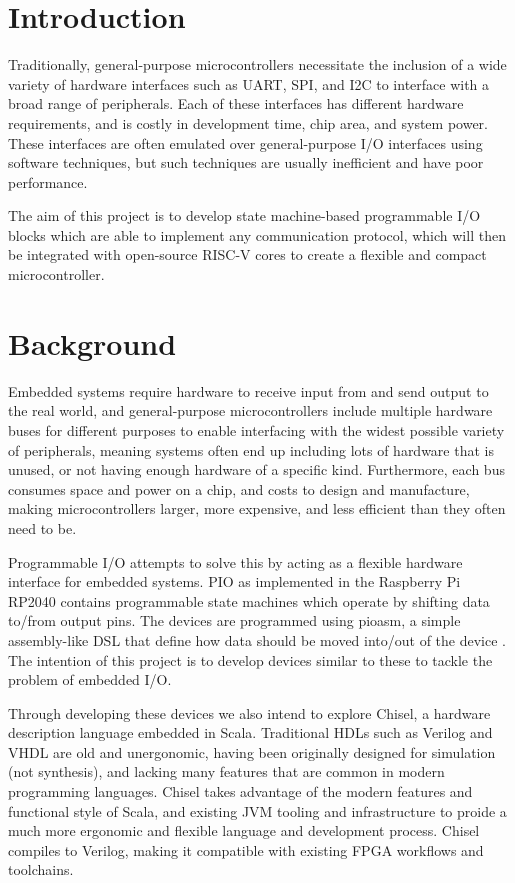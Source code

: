 \documentclass[a4paper,fleqn,12pt]{article}
\begin{document}


\pagestyle{plain}

\section{Introduction}

Traditionally, general-purpose microcontrollers necessitate the inclusion of a wide variety of hardware interfaces such as UART, SPI, and I2C to interface with a broad range of peripherals. Each of these interfaces has different hardware requirements, and is costly in development time, chip area, and system power. These interfaces are often emulated over general-purpose I/O interfaces using software techniques, but such techniques are usually inefficient and have poor performance.

The aim of this project is to develop state machine-based programmable I/O blocks which are able to implement any communication protocol, which will then be integrated with open-source RISC-V cores to create a flexible and compact microcontroller.

\section{Background}

Embedded systems require hardware to receive input from and send output to the real world, and general-purpose microcontrollers include multiple hardware buses for different purposes to enable interfacing with the widest possible variety of peripherals, meaning systems often end up including lots of hardware that is unused, or not having enough hardware of a specific kind. Furthermore, each bus consumes space and power on a chip, and costs to design and manufacture, making microcontrollers larger, more expensive, and less efficient than they often need to be.

Programmable I/O attempts to solve this by acting as a flexible hardware interface for embedded systems. PIO as implemented in the Raspberry Pi RP2040 contains programmable state machines which operate by shifting data to/from output pins. The devices are programmed using pioasm, a simple assembly-like DSL that define how data should be moved into/out of the device \cite{rp2040}. The intention of this project is to develop devices similar to these to tackle the problem of embedded I/O.

Through developing these devices we also intend to explore Chisel, a hardware description language embedded in Scala. Traditional HDLs such as Verilog and VHDL are old and unergonomic, having been originally designed for simulation (not synthesis), and lacking many features that are common in modern programming languages. Chisel takes advantage of the modern features and functional style of Scala, and existing JVM tooling and infrastructure to proide a much more ergonomic and flexible language and development process. Chisel compiles to Verilog, making it compatible with existing FPGA workflows and toolchains.
\end{document}
